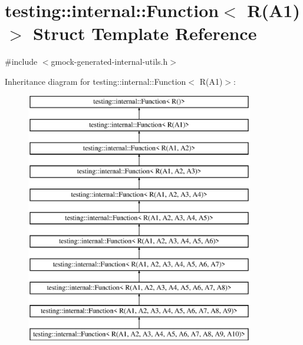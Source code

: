 \hypertarget{structtesting_1_1internal_1_1_function_3_01_r_07_a1_08_4}{}\section{testing\+::internal\+::Function$<$ R(A1)$>$ Struct Template Reference}
\label{structtesting_1_1internal_1_1_function_3_01_r_07_a1_08_4}


{\ttfamily \#include $<$gmock-\/generated-\/internal-\/utils.\+h$>$}

Inheritance diagram for testing\+::internal\+::Function$<$ R(A1)$>$\+:\begin{figure}[H]
\begin{center}
\leavevmode
\includegraphics[height=11.000000cm]{d7/d89/structtesting_1_1internal_1_1_function_3_01_r_07_a1_08_4}
\end{center}
\end{figure}
